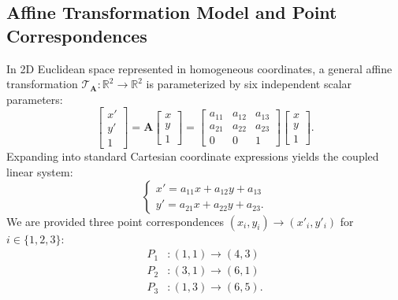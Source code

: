 \documentclass[11pt,a4paper]{article}
\begin{document}
\subsection{Affine Transformation Model and Point Correspondences}
In 2D Euclidean space represented in homogeneous coordinates, a general affine transformation $\mathcal{T}_{\mathbf{A}}: \mathbb{R}^2 \to \mathbb{R}^2$ is parameterized by six independent scalar parameters:
\begin{equation}
\begin{bmatrix} x' \\ y' \\ 1 \end{bmatrix} = \mathbf{A} \begin{bmatrix} x \\ y \\ 1 \end{bmatrix} = \begin{bmatrix} a_{11} & a_{12} & a_{13} \\ a_{21} & a_{22} & a_{23} \\ 0 & 0 & 1 \end{bmatrix} \begin{bmatrix} x \\ y \\ 1 \end{bmatrix}.
\end{equation}
Expanding into standard Cartesian coordinate expressions yields the coupled linear system:
\begin{equation}
\begin{cases}
x' = a_{11} x + a_{12} y + a_{13} \\
y' = a_{21} x + a_{22} y + a_{23}.
\end{cases}
\end{equation}
We are provided three point correspondences $(x_i, y_i) \to (x'_i, y'_i)$ for $i \in \{1, 2, 3\}$:
\begin{align}
P_1&: (1, 1) \longrightarrow (4, 3) \\
P_2&: (3, 1) \longrightarrow (6, 1) \\
P_3&: (1, 3) \longrightarrow (6, 5).
\end{align}
\end{document}
